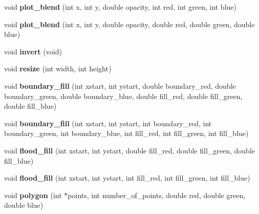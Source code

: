 \begin{DoxyCompactItemize}
\item 
\hypertarget{classpngwriter_a7d8b0f097c948dc7dfdf2ecbafba9c81}{}void {\bfseries plot\+\_\+blend} (int x, int y, double opacity, int red, int green, int blue)\label{classpngwriter_a7d8b0f097c948dc7dfdf2ecbafba9c81}

\item 
\hypertarget{classpngwriter_a9d47285c609ab4424620d82486fe5699}{}void {\bfseries plot\+\_\+blend} (int x, int y, double opacity, double red, double green, double blue)\label{classpngwriter_a9d47285c609ab4424620d82486fe5699}

\item 
\hypertarget{classpngwriter_a38c41d06c4f2dfc2de9fd6ed84b542d5}{}void {\bfseries invert} (void)\label{classpngwriter_a38c41d06c4f2dfc2de9fd6ed84b542d5}

\item 
\hypertarget{classpngwriter_a8487569bddca39bac78304eeff1c840a}{}void {\bfseries resize} (int width, int height)\label{classpngwriter_a8487569bddca39bac78304eeff1c840a}

\item 
\hypertarget{classpngwriter_a5aa80abc578451adb507823313d351b4}{}void {\bfseries boundary\+\_\+fill} (int xstart, int ystart, double boundary\+\_\+red, double boundary\+\_\+green, double boundary\+\_\+blue, double fill\+\_\+red, double fill\+\_\+green, double fill\+\_\+blue)\label{classpngwriter_a5aa80abc578451adb507823313d351b4}

\item 
\hypertarget{classpngwriter_a335ff30c19d713e759930fb3a4d16f30}{}void {\bfseries boundary\+\_\+fill} (int xstart, int ystart, int boundary\+\_\+red, int boundary\+\_\+green, int boundary\+\_\+blue, int fill\+\_\+red, int fill\+\_\+green, int fill\+\_\+blue)\label{classpngwriter_a335ff30c19d713e759930fb3a4d16f30}

\item 
\hypertarget{classpngwriter_a960eba8de801589cd27e7bb9dbf331f7}{}void {\bfseries flood\+\_\+fill} (int xstart, int ystart, double fill\+\_\+red, double fill\+\_\+green, double fill\+\_\+blue)\label{classpngwriter_a960eba8de801589cd27e7bb9dbf331f7}

\item 
\hypertarget{classpngwriter_a3c267eefc3bbcc053f34e57d48c71f3b}{}void {\bfseries flood\+\_\+fill} (int xstart, int ystart, int fill\+\_\+red, int fill\+\_\+green, int fill\+\_\+blue)\label{classpngwriter_a3c267eefc3bbcc053f34e57d48c71f3b}

\item 
\hypertarget{classpngwriter_ae67344d22ab1c57b830f2497d87dd6d6}{}void {\bfseries polygon} (int $\ast$points, int number\+\_\+of\+\_\+points, double red, double green, double blue)\label{classpngwriter_ae67344d22ab1c57b830f2497d87dd6d6}


\end{DoxyCompactItemize}

